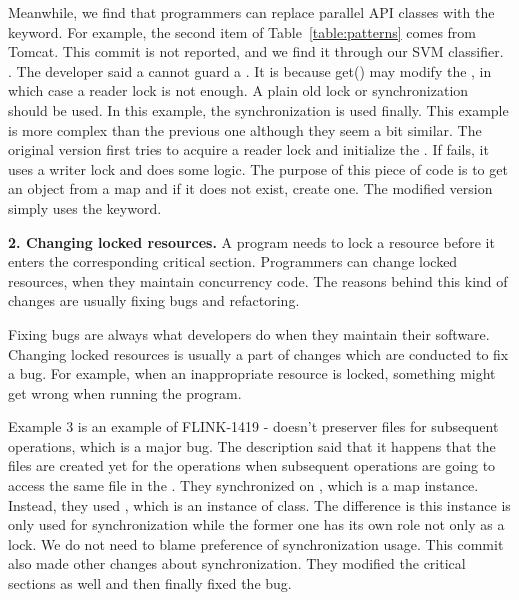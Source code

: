 Meanwhile, we find that programmers can replace parallel API classes with the  keyword. For example, the second item of Table~\ref{table:patterns} comes from Tomcat. This commit is not reported, and we find it through our SVM classifier. . The developer said a  cannot guard a . It is because get() may modify the , in which case a reader lock is not enough. A plain old lock or synchronization should be used. In this example, the synchronization is used finally. This example is more complex than the previous one although they seem a bit similar. The original version first tries to acquire a reader lock and initialize the . If fails, it uses a writer lock and does some logic. The purpose of this piece of code is to get an object from a map and if it does not exist, create one. The modified version simply uses the  keyword.%



\noindent
\textbf{2. Changing locked resources.} A program needs to lock a resource before it enters the corresponding critical section. Programmers can change locked resources, when they maintain concurrency code. The reasons behind this kind of changes are usually fixing bugs and refactoring.%

Fixing bugs are always what developers do when they maintain their software. Changing locked resources is usually a part of changes which are conducted to fix a bug. For example, when an inappropriate resource is locked, something might get wrong when running the program.

Example 3 is an example of FLINK-1419 -  doesn't preserver files for subsequent operations, which is a major bug. The description said that it happens that the files are created yet for the operations when subsequent operations are going to access the same file in the . They synchronized on , which is a map instance. Instead, they used , which is an instance of  class. The difference is this instance is only used for synchronization while the former one has its own role not only as a lock. We do not need to blame preference of synchronization usage. This commit also made other changes about synchronization. They modified the critical sections as well and then finally fixed the bug.

